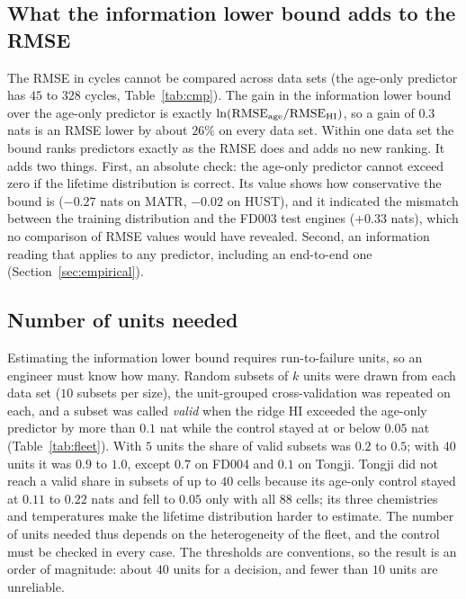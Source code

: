 \documentclass[preprint,12pt]{elsarticle}
\theoremstyle{definition}
\begin{document}
\subsection{What the information lower bound adds to the RMSE}
The RMSE in cycles cannot be compared across data sets (the age-only predictor has $45$ to $328$ cycles, Table~\ref{tab:cmp}). The gain in the information lower bound over the age-only predictor is exactly $\ln(\mathrm{RMSE}_{\rm age}/\mathrm{RMSE}_{\rm HI})$, so a gain of $0.3$ nats is an RMSE lower by about $26\%$ on every data set. Within one data set the bound ranks predictors exactly as the RMSE does and adds no new ranking. It adds two things. First, an absolute check: the age-only predictor cannot exceed zero if the lifetime distribution is correct. Its value shows how conservative the bound is ($-0.27$ nats on MATR, $-0.02$ on HUST), and it indicated the mismatch between the training distribution and the FD003 test engines ($+0.33$ nats), which no comparison of RMSE values would have revealed. Second, an information reading that applies to any predictor, including an end-to-end one (Section~\ref{sec:empirical}).

\begin{table}[!t]
\caption{RMSE and information lower bound of the age-only predictor and of the ridge HI (cross-validation). Gain: difference of the information lower bounds, equal to $\ln$ of the RMSE ratio.}
\label{tab:cmp}
\centering\scriptsize
{}
\end{table}

\subsection{Number of units needed}
\label{sec:fleet}
Estimating the information lower bound requires run-to-failure units, so an engineer must know how many. Random subsets of $k$ units were drawn from each data set ($10$ subsets per size), the unit-grouped cross-validation was repeated on each, and a subset was called \emph{valid} when the ridge HI exceeded the age-only predictor by more than $0.1$ nat while the control stayed at or below $0.05$ nat (Table~\ref{tab:fleet}). With $5$ units the share of valid subsets was $0.2$ to $0.5$; with $40$ units it was $0.9$ to $1.0$, except $0.7$ on FD004 and $0.1$ on Tongji. Tongji did not reach a valid share in subsets of up to $40$ cells because its age-only control stayed at $0.11$ to $0.22$ nats and fell to $0.05$ only with all $88$ cells; its three chemistries and temperatures make the lifetime distribution harder to estimate. The number of units needed thus depends on the heterogeneity of the fleet, and the control must be checked in every case. The thresholds are conventions, so the result is an order of magnitude: about $40$ units for a decision, and fewer than $10$ units are unreliable.
\end{document}

